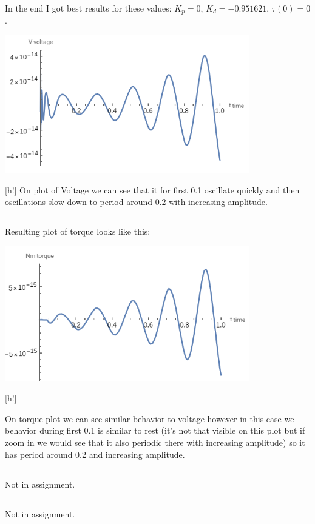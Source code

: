 \documentclass[a4paper]{article}
\begin{document}
	In the end I got best results for these values: $K_p=0$, $K_d=-0.951621$, $\tau(0)=0$.
	\\
	\centerline{\includegraphics[width=0.8\textwidth]{3_a_v}}[h!]
	On plot of Voltage we can see that it for first 0.1 oscillate quickly and then oscillations slow down to period around 0.2 with increasing amplitude.
	
	\subsection{}
	Resulting plot of torque looks like this:
	\\
	\centerline{\includegraphics[width=0.8\textwidth]{3_b_t}}[h!]
	
	On torque plot we can see similar behavior to voltage however in this case we behavior during first 0.1 is similar to rest (it's not that visible on this plot but if zoom in we would see that it also periodic there with increasing amplitude) so it has period around 0.2 and increasing amplitude.
	
	\subsection{}
	Not in assignment.
	\subsection{}
	Not in assignment.
	
\end{document}
